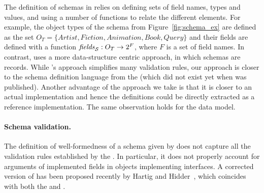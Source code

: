 The definition of schemas in \HP relies on defining sets of field names, types and values, and using a number of functions to relate the different elements.
For example, the object types of the schema from Figure~\ref{fig:schema_ex} are defined as the set $O_{T} = \{\mathit{Artist, Fiction, Animation, Book, Query}\}$ and their fields are defined with a
function $\mathit{fields}_{\mathcal{S}} : O_{T} \to 2^{F}$, where $F$ is a set of field names.
In contrast, \gcoql uses a more data-structure centric approach, in which schemas are records.
While \HP's approach simplifies many validation rules, our approach is closer to the schema definition language from the \spec (which did not exist yet when \HP was published). 
Another advantage of the approach we take is that it is closer to an actual implementation
and hence the definitions could be directly extracted as a reference implementation. The same observation holds for the data model.



\paragraph{Schema validation.} The definition of well-formedness
of a schema given by \HP does not capture all the validation rules established by the \spec. In particular, it does not properly account for arguments of implemented fields in objects implementing interfaces. A corrected version of \HP has been proposed recently by Hartig and Hidder~\cite{olafschema}, which coincides with both the \spec and \gcoql. 


